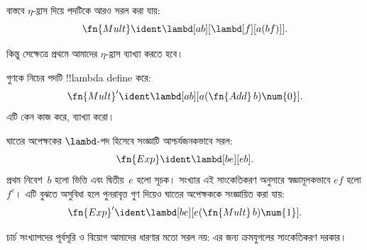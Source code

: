 \documentclass[../../../include/open-logic-section]{subfiles}
\begin{document}
\begin{editorial}
বাস্তবে $\eta$-হ্রাস দিয়ে পদটিকে আরও সরল করা যায়:
\[
  \fn{Mult} \ident \lambd[ab][\lambd[f][a (b f)]].
\]

কিন্তু সেক্ষেত্রে প্রথমে আমাদের $\eta$-হ্রাস ব্যাখ্যা করতে হবে।
\end{editorial}

\begin{prob}
গুণকে নিচের পদটি !!{lambda define} করে:
\[
  \fn{Mult}' \ident \lambd[ab][a (\fn{Add}\, b) \num{0}].
\]
এটি কেন কাজ করে, ব্যাখ্যা করো।
\end{prob}

ঘাতের অপেক্ষকের $\lambd$-পদ হিসেবে সংজ্ঞাটি আশ্চর্যজনকভাবে সরল:
\[
  \fn{Exp} \ident \lambd[be][e b].
\]
প্রথম নিবেশ~$b$ হলো ভিত্তি এবং দ্বিতীয়~$e$ হলো সূচক। সংখ্যার এই
সাংকেতিকরণ অনুসারে স্বজ্ঞামূলকভাবে $e f$ হলো $f^e$। এটি বুঝতে অসুবিধা
হলে পুনরাবৃত্ত গুণ দিয়েও ঘাতের অপেক্ষককে সংজ্ঞায়িত করা যায়:
\[
  \fn{Exp}' \ident \lambd[be][e (\fn{Mult}\, b) \num{1}].
\]

চার্চ সংখ্যাপদের পূর্বসূরি ও বিয়োগ আমাদের ধারণার মতো সরল নয়: এর জন্য
ক্রমযুগলের সাংকেতিকরণ দরকার।
\end{document}
